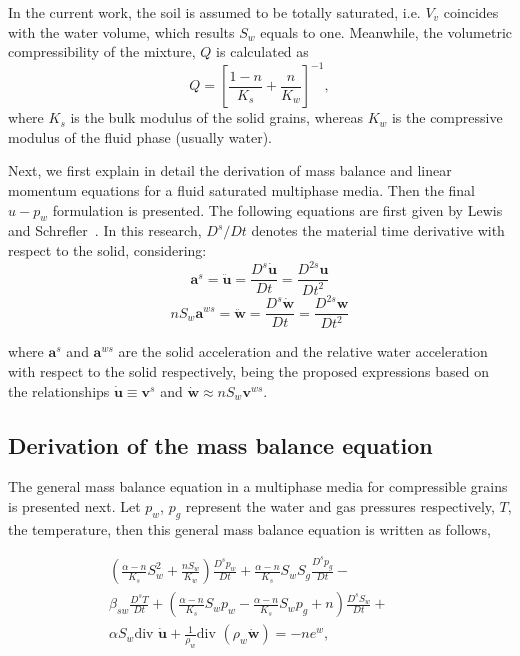 \documentclass[twocolumn]{svjour3}          %
\begin{document}
In the current work, the soil is assumed to be totally saturated, i.e. $V_v$ coincides with the water volume, which results  $S_w$ equals to one. 
Meanwhile, the volumetric compressibility of the mixture, $Q$ \cite{Zienkiewicz99} is calculated as
\begin{equation}\label{eq_uw4}
Q = \left[ \frac{1-n}{K_s} + \frac{n}{K_w} \right]^{-1},
\end{equation}
where $K_s$ is the bulk modulus of  the solid grains, whereas  $K_w$ is  the compressive modulus of the fluid phase (usually water).

Next, we first  explain in detail the derivation of mass balance and linear momentum equations for a fluid saturated multiphase media. Then the final $u-p_w$ formulation is presented. The following equations are first given by Lewis and Schrefler~\cite{LewisSchrefler98}. In this research, $D^s/Dt$ denotes the material time derivative with respect to the solid, considering:
$$
\boldsymbol{a}^s =  \ddot{\boldsymbol{u}} = \frac{D^s \dot{\boldsymbol{u}}}{Dt} = \frac{D^{2s} \boldsymbol{u}}{Dt^2}
$$
$$
n S_w \boldsymbol{a}^{ws} =  \ddot{\boldsymbol{w}} = \frac{D^s \dot{\boldsymbol{w}}}{Dt} = \frac{D^{2s} \boldsymbol{w}}{Dt^2}
$$

where  $\boldsymbol{a}^s$ and $\boldsymbol{a}^{ws}$ are the solid acceleration and the relative water acceleration with respect to the solid respectively, being the proposed expressions based on the relationships $\boldsymbol{\dot{u}} \equiv \boldsymbol{v}^{s}$ and $\boldsymbol{\dot{w}} \approx nS_w \boldsymbol{v}^{ws}$.


\subsection{Derivation of the mass balance equation}\label{subsec:21}
The general mass balance equation in a multiphase media for compressible grains is presented next. 
Let $p_w$, $p_g$ represent the water and gas pressures respectively, $T$, the temperature, %
then this general mass balance equation is written as follows,

\begin{eqnarray}\label{eq_uw6}
\left( \frac{\alpha-n}{K_s}S_w^2+\frac{nS_w}{K_w}\right)\frac{D^s p_w}{D t} + \frac{\alpha-n}{K_s}S_wS_g\frac{D^s p_g}{D t} -&&  \nonumber \\ 
 \beta_{sw}\frac{D^s T}{D t} +  \left(\frac{\alpha-n}{K_s}S_w p_w-\frac{\alpha-n}{K_s}S_w p_g+n\right)\frac{D^s S_w}{D t}  +&&  \nonumber \\ 
\alpha S_w  \mbox{div } \dot{\boldsymbol{u}}  + \frac{1}{\rho_w} \mbox{div } (\rho_w \dot{\boldsymbol{w}}) = - n e^w, &&  %
\end{eqnarray}
\end{document}
